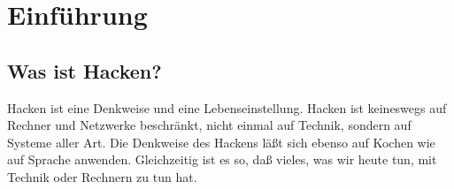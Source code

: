 
\chapter{Einführung}

\section{Was ist Hacken?}

Hacken ist eine Denkweise und eine Lebenseinstellung. Hacken ist keineswegs auf Rechner und Netzwerke beschränkt, nicht einmal auf Technik, sondern auf Systeme aller Art. Die Denkweise des Hackens läßt sich ebenso auf Kochen wie auf Sprache anwenden. Gleichzeitig ist es so, daß vieles, was wir heute tun, mit Technik oder Rechnern zu tun hat.

